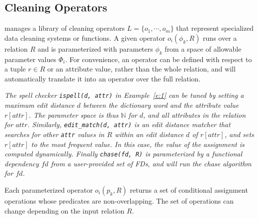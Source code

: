 \subsection{Cleaning Operators}


\sys manages a library of cleaning operators $L = \{o_1, \cdots, o_m\}$ that represent specialized data cleaning systems or functions.  A given operator $o_i(\phi_k, R)$ runs over a relation $R$ and is parameterized with parameters $\phi_k$ from a space of allowable parameter values $\Phi_i$.  For convenience, an operator can be defined with respect to a tuple $r\in R$  or an attribute value, rather than the whole relation, and \sys will automatically translate it into an operator over the full relation.

\begin{example}\it\label{e:2}
  The spell checker  \texttt{ispell(d, attr)} in Example~\ref{e:1} can be tuned by setting a maximum edit distance $d$ between the dictionary word and the attribute value $r[attr]$.  The parameter space is thus $\mathbb{N}$ for $d$, and all attributes in the relation for $attr$. Similarly, \texttt{edit\_match(d, attr)} is an edit distance matcher that searches for other \texttt{attr} values in $R$ within an edit distance $d$ of $r[attr]$, and sets $r[attr]$ to the most frequent value.  In this case, the value of the assignment is computed dynamically.  Finally \texttt{chase(fd, R)} is parameterized by a functional dependency $fd$ from a user-provided set of FDs, and will run the chase algorithm~\cite{Deutsch2008TheCR} for $fd$. 
\end{example}

Each parameterized operator $o_i(p_k, R)$ returns a set of conditional assignment operations whose predicates are non-overlapping.  The set of operations can change depending on the input relation $R$.   %


